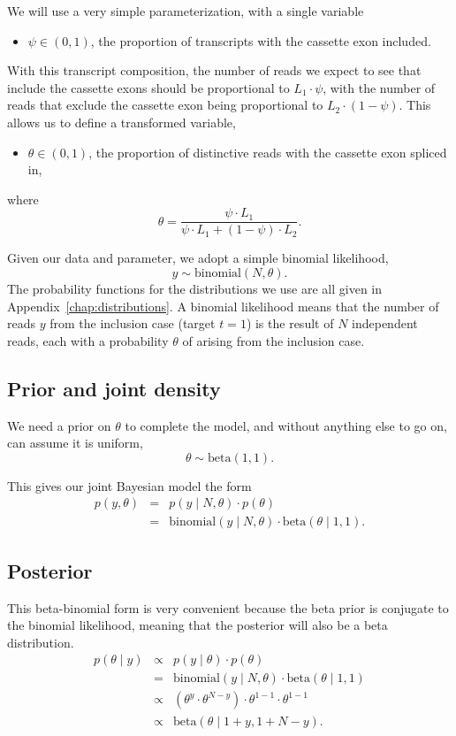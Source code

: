 \documentclass[11pt]{report}
\begin{document}
We will use a very simple parameterization, with a single variable
%
\begin{itemize}
\item $\psi \in (0, 1)$, the proportion of transcripts with the
  cassette exon included.
\end{itemize}
%
With this transcript composition, the number of reads we expect to see
that include the cassette exons should be proportional to $L_1 \cdot
\psi$, with the number of reads that exclude the cassette exon being
proportional to $L_2 \cdot (1 - \psi)$.  This allows us to
define a transformed variable,
%
\begin{itemize}
\item $\theta \in (0, 1)$, the proportion of distinctive reads with
  the cassette exon spliced in,
\end{itemize}
%
where
\[
  \theta = \frac{\psi \cdot L_1}{\psi \cdot L_1 + (1 - \psi) \cdot L_2}.
\]
\vspace*{4pt}

Given our data and parameter, we adopt a simple binomial likelihood,
%
\[
  y \sim \textrm{binomial}(N, \theta).
\]
%
The probability functions for the distributions we use are all given
in Appendix~\ref{chap:distributions}.  A binomial likelihood means
that the number of reads $y$ from the inclusion case (target $t = 1$)
is the result of $N$ independent reads, each with a probability $\theta$
of arising from the inclusion case.

\subsection{Prior and joint density}

We need a prior on $\theta$ to complete the model, and without
anything else to go on, can assume it is uniform,
%
\[
  \theta \sim \textrm{beta}(1, 1).
\]
%

This gives our joint Bayesian model the form
%
\begin{eqnarray*}
  p(y, \theta)
  & = & p(y \mid N, \theta) \cdot p(\theta)
  \\
  & = & \textrm{binomial}(y \mid N, \theta) \cdot \textrm{beta}(\theta \mid 1, 1).
\end{eqnarray*}
%

\subsection{Posterior}

This beta-binomial form is very convenient because the beta prior is
conjugate to the binomial likelihood, meaning that the posterior will
also be a beta distribution.
%
\begin{eqnarray*}
  p(\theta \mid y)
  & \propto &
              p(y \mid \theta) \cdot p(\theta)
  \\
  & = & \textrm{binomial}(y \mid N, \theta) \cdot \textrm{beta}(\theta \mid 1, 1)
  \\
  & \propto &
              \left( \theta^y \cdot \theta^{N - y} \right)
              \cdot
              \theta^{1 - 1} \cdot \theta^{1 - 1}
  \\
  & \propto & \textrm{beta}(\theta \mid 1 + y, 1 + N - y).
\end{eqnarray*}
\end{document}
